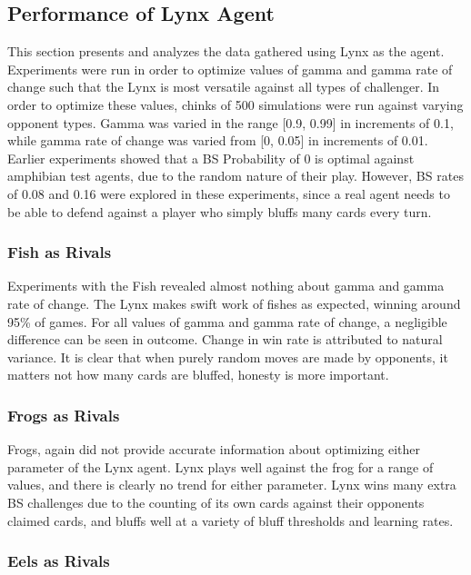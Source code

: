 \documentclass[a4paper,11pt]{article}
\begin{document}
\subsection{Performance of Lynx Agent}
This section presents and analyzes the data gathered using Lynx as the agent. Experiments were run in order to optimize values of gamma and gamma rate of change such that the Lynx is most versatile against all types of challenger.
In order to optimize these values, chinks of 500 simulations were run against varying opponent types. Gamma was varied in the range [0.9, 0.99] in increments of 0.1, while gamma rate of change was varied from [0, 0.05] in increments 
of 0.01. Earlier experiments showed that a BS Probability of 0 is optimal against amphibian test agents, due to the random nature of their play. However, BS rates of 0.08 and 0.16 were explored in these experiments, since a real agent 
needs to be able to defend against a player who simply bluffs many cards every turn. 


\subsubsection{Fish as Rivals}

Experiments with the Fish revealed almost nothing about gamma and gamma rate of change. The Lynx makes swift work of fishes as expected, winning around 95\% of games. For all values of gamma and gamma rate of change, a negligible
difference can be seen in outcome. Change in win rate is attributed to natural variance. It is clear that when purely random moves are made by opponents, it matters not how many cards are bluffed, honesty is more important.

\subsubsection{Frogs as Rivals}

Frogs, again did not provide accurate information about optimizing either parameter of the Lynx agent. Lynx plays well against the frog for a range of values, and there is clearly no trend for either parameter. Lynx wins many extra
BS challenges due to the counting of its own cards against their opponents claimed cards, and bluffs well at a variety of bluff thresholds and learning rates. 

\subsubsection{Eels as Rivals}
\end{document}
